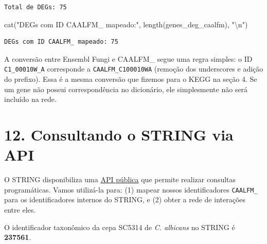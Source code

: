 \documentclass[
  letterpaper,
  DIV=11,
  numbers=noendperiod]{scrreprt}
\newenvironment{Shaded}{\begin{snugshade}}{\end{snugshade}}
\newcommand{\FunctionTok}[1]{\textcolor[rgb]{0.28,0.35,0.67}{#1}}
\newcommand{\NormalTok}[1]{\textcolor[rgb]{0.00,0.23,0.31}{#1}}
\newcommand{\SpecialCharTok}[1]{\textcolor[rgb]{0.37,0.37,0.37}{#1}}
\newcommand{\StringTok}[1]{\textcolor[rgb]{0.13,0.47,0.30}{#1}}
\begin{document}
\begin{verbatim}
Total de DEGs: 75 
\end{verbatim}

\begin{Shaded}
\begin{Highlighting}[]
\FunctionTok{cat}\NormalTok{(}\StringTok{"DEGs com ID CAALFM\_ mapeado:"}\NormalTok{, }\FunctionTok{length}\NormalTok{(genes\_deg\_caalfm), }\StringTok{"}\SpecialCharTok{\textbackslash{}n}\StringTok{"}\NormalTok{)}
\end{Highlighting}
\end{Shaded}

\begin{verbatim}
DEGs com ID CAALFM_ mapeado: 75 
\end{verbatim}

\begin{tcolorbox}[enhanced jigsaw, arc=.35mm, bottomrule=.15mm, bottomtitle=1mm, breakable, colback=white, colbacktitle=quarto-callout-note-color!10!white, colframe=quarto-callout-note-color-frame, coltitle=black, left=2mm, leftrule=.75mm, opacityback=0, opacitybacktitle=0.6, rightrule=.15mm, title=\textcolor{quarto-callout-note-color}{\faInfo}\hspace{0.5em}{Ponto Importante --- Conversão de Identificadores}, titlerule=0mm, toprule=.15mm, toptitle=1mm]

A conversão entre Ensembl Fungi e CAALFM\_ segue uma regra simples: o ID
\texttt{C1\_00010W\_A} corresponde a \texttt{CAALFM\_C100010WA} (remoção
dos underscores e adição do prefixo). Essa é a mesma conversão que
fizemos para o KEGG na seção 4. Se um gene não possui correspondência no
dicionário, ele simplesmente não será incluído na rede.

\end{tcolorbox}

\section{12. Consultando o STRING via
API}\label{consultando-o-string-via-api}

O STRING disponibiliza uma \href{https://string-db.org/help/api/}{API
pública} que permite realizar consultas programáticas. Vamos utilizá-la
para: (1) mapear nossos identificadores \texttt{CAALFM\_} para os
identificadores internos do STRING, e (2) obter a rede de interações
entre eles.

O identificador taxonômico da cepa SC5314 de \emph{C. albicans} no
STRING é \textbf{237561}.
\end{document}
